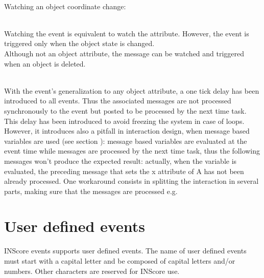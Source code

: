 \documentclass[a4paper,twoside]{report}
\newcommand{\sublevel}[1]	{\section{#1}}
\begin{document}
\example \\
Watching an object  coordinate change:

\note \\
Watching the  event is equivalent to watch the  attribute. However, the  event is triggered only when the object state is changed.\\
Although not an object attribute, the  message can be watched and triggered when an object is deleted.

\warning \\
With the event's generalization to any object attribute, a one tick delay has been introduced to all events. Thus the associated messages are not processed synchronously to the event but posted to be processed by the next time task. This delay has been introduced to avoid freezing the system in case of loops. However, it introduces also a pitfall in interaction design, when message based variables are used (see section ): message based variables are evaluated at the event time while messages are processed by the next time task, thus the following messages won't produce the expected result:
actually, when the  variable is evaluated, the preceding message that sets the x attribute of A has not been already processed.
One workaround consists in splitting the interaction in several parts, making sure that the messages are processed e.g.




\sublevel{User defined events}
\label{userevents}

INScore events supports user defined events. The name of user defined events must start with a capital letter and be composed of capital letters and/or numbers. Other characters are reserved for INScore use.
\end{document}
